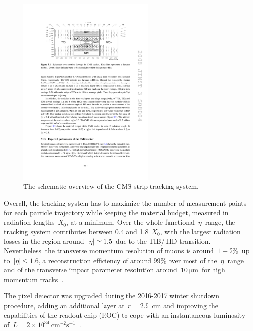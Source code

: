 \begin{figure}
\begin{centering}
\includegraphics[width=0.6\textwidth]{figures/exp/tracker.pdf}
\caption[The CMS strip tracker]{The schematic overview of the CMS strip tracking system.}
\label{fig:cms_tracker}
\end{centering}
\end{figure}

Overall, the tracking system has to maximize the number of measurement points for each particle trajectory while keeping the material budget, measured in radiation lengths~$X_0$, at a minimum. Over the whole functional~$\eta$~range, the tracking system contributes between 0.4 and 1.8~$X_0$, with the largest radiation losses in the region around~$|\eta| \simeq 1.5$~due to the TIB/TID transition. Nevertheless, the transverse momentum resolution of muons is around~$1-2\%$~up to~$|\eta| \leq 1.6$, a reconstruction efficiency of around 99\% over most of the~$\eta$~range and of the transverse impact parameter resolution around~$10~\mathrm{\mu m}$~for high momentum tracks~\cite{Chatrchyan:2008aa}. 

The pixel detector was upgraded during the 2016-2017 winter shutdown procedure, adding an additional layer at~$r=2.9$~cm and improving the capabilities of the readout chip (ROC) to cope with an instantaneous luminosity of~$L = 2 \times 10^{34}\ \mathrm{cm}^{-2}\mathrm{s}^{-1}$~\cite{Tavolaro:2016hfj}.

